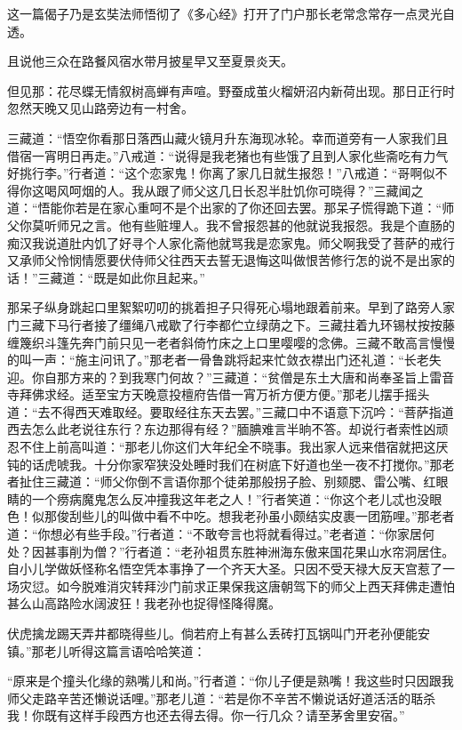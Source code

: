 \documentclass[12pt,UTF8]{ctexbook}
\begin{document}
这一篇偈子乃是玄奘法师悟彻了《多心经》打开了门户那长老常念常存一点灵光自透。

且说他三众在路餐风宿水带月披星早又至夏景炎天。

但见那：花尽蝶无情叙树高蝉有声喧。野蚕成茧火榴妍沼内新荷出现。那日正行时忽然天晚又见山路旁边有一村舍。

三藏道：“悟空你看那日落西山藏火镜月升东海现冰轮。幸而道旁有一人家我们且借宿一宵明日再走。”八戒道：“说得是我老猪也有些饿了且到人家化些斋吃有力气好挑行李。”行者道：“这个恋家鬼！你离了家几日就生报怨！”八戒道：“哥啊似不得你这喝风呵烟的人。我从跟了师父这几日长忍半肚饥你可晓得？”三藏闻之道：“悟能你若是在家心重呵不是个出家的了你还回去罢。那呆子慌得跪下道：“师父你莫听师兄之言。他有些赃埋人。我不曾报怨甚的他就说我报怨。我是个直肠的痴汉我说道肚内饥了好寻个人家化斋他就骂我是恋家鬼。师父啊我受了菩萨的戒行又承师父怜悯情愿要伏侍师父往西天去誓无退悔这叫做恨苦修行怎的说不是出家的话！”三藏道：“既是如此你且起来。”

那呆子纵身跳起口里絮絮叨叨的挑着担子只得死心塌地跟着前来。早到了路旁人家门三藏下马行者接了缰绳八戒歇了行李都伫立绿荫之下。三藏拄着九环锡杖按按藤缠篾织斗篷先奔门前只见一老者斜倚竹床之上口里嘤嘤的念佛。三藏不敢高言慢慢的叫一声：“施主问讯了。”那老者一骨鲁跳将起来忙敛衣襟出门还礼道：“长老失迎。你自那方来的？到我寒门何故？”三藏道：“贫僧是东土大唐和尚奉圣旨上雷音寺拜佛求经。适至宝方天晚意投檀府告借一宵万祈方便方便。”那老儿摆手摇头道：“去不得西天难取经。要取经往东天去罢。”三藏口中不语意下沉吟：“菩萨指道西去怎么此老说往东行？东边那得有经？”腼腆难言半晌不答。却说行者索性凶顽忍不住上前高叫道：“那老儿你这们大年纪全不晓事。我出家人远来借宿就把这厌钝的话虎唬我。十分你家窄狭没处睡时我们在树底下好道也坐一夜不打搅你。”那老者扯住三藏道：“师父你倒不言语你那个徒弟那般拐子脸、别颏腮、雷公嘴、红眼睛的一个痨病魔鬼怎么反冲撞我这年老之人！”行者笑道：“你这个老儿忒也没眼色！似那俊刮些儿的叫做中看不中吃。想我老孙虽小颇结实皮裹一团筋哩。”那老者道：“你想必有些手段。”行者道：“不敢夸言也将就看得过。”老者道：“你家居何处？因甚事削为僧？”行者道：“老孙祖贯东胜神洲海东傲来国花果山水帘洞居住。自小儿学做妖怪称名悟空凭本事挣了一个齐天大圣。只因不受天禄大反天宫惹了一场灾愆。如今脱难消灾转拜沙门前求正果保我这唐朝驾下的师父上西天拜佛走遭怕甚么山高路险水阔波狂！我老孙也捉得怪降得魔。

伏虎擒龙踢天弄井都晓得些儿。倘若府上有甚么丢砖打瓦锅叫门开老孙便能安镇。”那老儿听得这篇言语哈哈笑道：

“原来是个撞头化缘的熟嘴儿和尚。”行者道：“你儿子便是熟嘴！我这些时只因跟我师父走路辛苦还懒说话哩。”那老儿道：“若是你不辛苦不懒说话好道活活的聒杀我！你既有这样手段西方也还去得去得。你一行几众？请至茅舍里安宿。”
\end{document}
